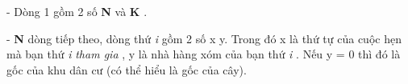 - Dòng 1 gồm 2 số \textbf{ N } và \textbf{ K } .

- \textbf{ N } dòng tiếp theo, dòng thứ \emph{ i } gồm 2 số x y. Trong đó x là thứ tự của cuộc hẹn mà bạn thứ \emph{ i }\emph{ tham gia } , y là nhà hàng xóm của bạn thứ \emph{ i } . Nếu y = 0 thì đó là gốc của khu dân cư (có thể hiểu là gốc của cây).

\